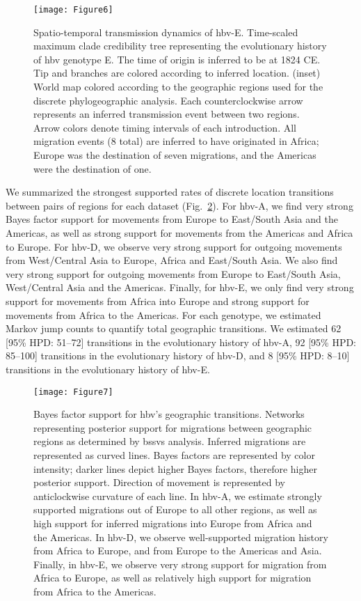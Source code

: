 \begin{figure}[ht]
  \centering
  \texttt{[image: Figure6]}
  \caption[HBV-E phylogeography]{Spatio-temporal transmission dynamics of \gls{hbv}-E. Time-scaled maximum clade credibility tree representing the evolutionary history of \gls{hbv} genotype E. The time of origin is inferred to be at 1824 CE. Tip and branches are colored  according to inferred location. (inset) World map colored according to the geographic regions used for the discrete phylogeographic analysis. Each counterclockwise arrow represents an inferred transmission event between two regions. Arrow colors denote timing intervals of each introduction. All migration events (8 total) are inferred to have originated in Africa; Europe was the destination of seven migrations, and the Americas were the destination of one.}
  \label{fig:3-6}
\end{figure}

We summarized the strongest supported rates of discrete location transitions between pairs of regions for each dataset (Fig.~\ref{fig:3-7}).
For \gls{hbv}-A, we find very strong Bayes factor support \citep{kass1995bayes} for movements from Europe to East/South Asia and the Americas, as well as strong support for movements from the Americas and Africa to Europe.
For \gls{hbv}-D, we observe very strong support for outgoing movements from West/Central Asia to Europe, Africa and East/South Asia.
We also find very strong support for outgoing movements from Europe to East/South Asia, West/Central Asia and the Americas.
Finally, for \gls{hbv}-E, we only find very strong support for movements from Africa into Europe and strong support for movements from Africa to the Americas.
For each genotype, we estimated Markov jump counts to quantify total geographic transitions.
We estimated 62 [95\% HPD: 51--72] transitions in the evolutionary history of \gls{hbv}-A, 92 [95\% HPD: 85--100] transitions in the evolutionary history of \gls{hbv}-D, and 8 [95\% HPD: 8--10] transitions in the evolutionary history of \gls{hbv}-E.

\begin{figure}[ht]
  \centering
  \texttt{[image: Figure7]}
  \caption[Bayes factor support for HBV migrations]{Bayes factor support for \gls{hbv}'s geographic transitions. Networks representing posterior support for migrations between geographic regions as determined by \gls{bssvs} analysis. Inferred migrations are represented as curved lines. Bayes factors are represented by color intensity; darker lines depict higher Bayes factors, therefore higher posterior support. Direction of movement is represented by anticlockwise curvature of each line. In \gls{hbv}-A, we estimate strongly supported migrations out of Europe to all other regions, as well as high support for inferred migrations into Europe from Africa and the Americas. In \gls{hbv}-D, we observe well-supported migration history from Africa to Europe, and from Europe to the Americas and Asia. Finally, in \gls{hbv}-E, we observe very strong support for migration from Africa to Europe, as well as relatively high support for migration from Africa to the Americas.}
  \label{fig:3-7}
\end{figure}

